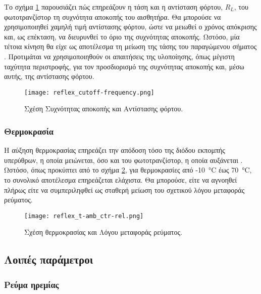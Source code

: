 Το σχήμα \ref{fig:reflex:cutoff-frequency} παρουσιάζει πώς επηρεάζουν η τάση και
η αντίσταση φόρτου, $R_L$, του φωτοτρανζίστορ τη συχνότητα αποκοπής του
αισθητήρα.
Θα μπορούσε να χρησιμοποιηθεί χαμηλή τιμή αντίστασης φόρτου, ώστε να
μειωθεί ο χρόνος απόκρισης και, ως επέκταση, να διευρυνθεί το όριο της
συχνότητας αποκοπής. Ωστόσο, μία τέτοια κίνηση θα είχε ως αποτέλεσμα τη
μείωση της τάσης του παραγώμενου σήματος \parencite{vishay06}.
Προτιμάται να χρησιμοποιηθούν οι απαιτήσεις της υλοποίησης, όπως μέγιστη
ταχύτητα περιστροφής, για τον προσδιορισμό της συχνότητας αποκοπής και, μέσω
αυτής, της αντίστασης φόρτου.

\begin{figure}
    \caption{Σχέση Συχνότητας αποκοπής και Αντίστασης φόρτου.
    \label{fig:reflex:cutoff-frequency}}
    \begin{center}%
    \texttt{[image: reflex\_cutoff-frequency.png]}
    \end{center}

\end{figure}

\subsubsection{Θερμοκρασία}
Η αύξηση θερμοκρασίας επηρεάζει την απόδοση τόσο της διόδου εκπομπής υπερύθρων,
η οποία μειώνεται, όσο και του φωτοτρανζίστορ, η οποία αυξάνεται
\parencite{vishay06}. Ωστόσο, όπως προκύπτει από το σχήμα
\ref{fig:reflex:t-amb_ctr-rel}, για θερμοκρασίες από -10~°C έως 70~°C, το
συνολικό αποτέλεσμα επηρεάζεται ελάχιστα. Θα μπορούσε, είτε να αγνοηθεί
πλήρως είτε να συμπεριληφθεί ως σταθερή μείωση του σχετικού λόγου μεταφοράς
ρεύματος.

\begin{figure}
    \caption{Σχέση θερμοκρασίας και Λόγου μεταφοράς ρεύματος.
    \label{fig:reflex:t-amb_ctr-rel}}
    \begin{center}%
    \texttt{[image: reflex\_t-amb\_ctr-rel.png]}
    \end{center}

\end{figure}

\subsection{Λοιπές παράμετροι}

\subsubsection{Ρεύμα ηρεμίας}

